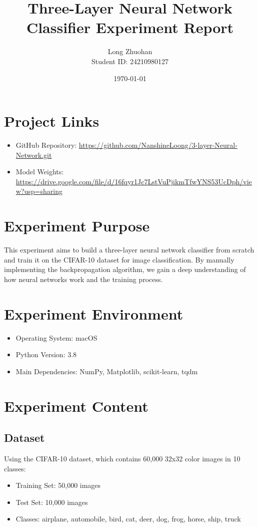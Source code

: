 \documentclass[12pt]{article}
\title{Three-Layer Neural Network Classifier Experiment Report}
\author{Long Zhuohan \\ Student ID: 24210980127}
\date{\today}
\begin{document}
\maketitle

\section{Project Links}
\begin{itemize}
    \item GitHub Repository: \url{https://github.com/NanshineLoong/3-layer-Neural-Network.git}
    \item Model Weights: \url{https://drive.google.com/file/d/16fqyr1Jc7LstVuPjikmTfwYNS53UcDph/view?usp=sharing}
\end{itemize}

\section{Experiment Purpose}
This experiment aims to build a three-layer neural network classifier from scratch and train it on the CIFAR-10 dataset for image classification. By manually implementing the backpropagation algorithm, we gain a deep understanding of how neural networks work and the training process.

\section{Experiment Environment}
\begin{itemize}
    \item Operating System: macOS
    \item Python Version: 3.8
    \item Main Dependencies: NumPy, Matplotlib, scikit-learn, tqdm
\end{itemize}

\section{Experiment Content}

\subsection{Dataset}
Using the CIFAR-10 dataset, which contains 60,000 32x32 color images in 10 classes:
\begin{itemize}
    \item Training Set: 50,000 images
    \item Test Set: 10,000 images
    \item Classes: airplane, automobile, bird, cat, deer, dog, frog, horse, ship, truck
\end{itemize}
\end{document}
